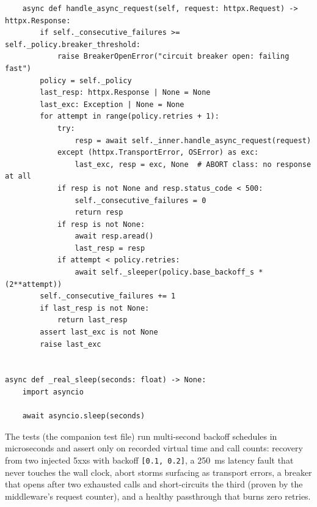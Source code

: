\begin{verbatim}
    async def handle_async_request(self, request: httpx.Request) -> httpx.Response:
        if self._consecutive_failures >= self._policy.breaker_threshold:
            raise BreakerOpenError("circuit breaker open: failing fast")
        policy = self._policy
        last_resp: httpx.Response | None = None
        last_exc: Exception | None = None
        for attempt in range(policy.retries + 1):
            try:
                resp = await self._inner.handle_async_request(request)
            except (httpx.TransportError, OSError) as exc:
                last_exc, resp = exc, None  # ABORT class: no response at all
            if resp is not None and resp.status_code < 500:
                self._consecutive_failures = 0
                return resp
            if resp is not None:
                await resp.aread()
                last_resp = resp
            if attempt < policy.retries:
                await self._sleeper(policy.base_backoff_s * (2**attempt))
        self._consecutive_failures += 1
        if last_resp is not None:
            return last_resp
        assert last_exc is not None
        raise last_exc


async def _real_sleep(seconds: float) -> None:
    import asyncio

    await asyncio.sleep(seconds)
\end{verbatim}

The tests (the companion test file) run multi-second backoff schedules
in microseconds and assert only on recorded virtual time and call counts:
recovery from two injected 5xxs with backoff \texttt{[0.1, 0.2]}, a 250~ms
latency fault that never touches the wall clock, abort storms surfacing as
transport errors, a breaker that opens after two exhausted calls and
short-circuits the third (proven by the middleware's request counter), and
a healthy passthrough that burns zero retries.

